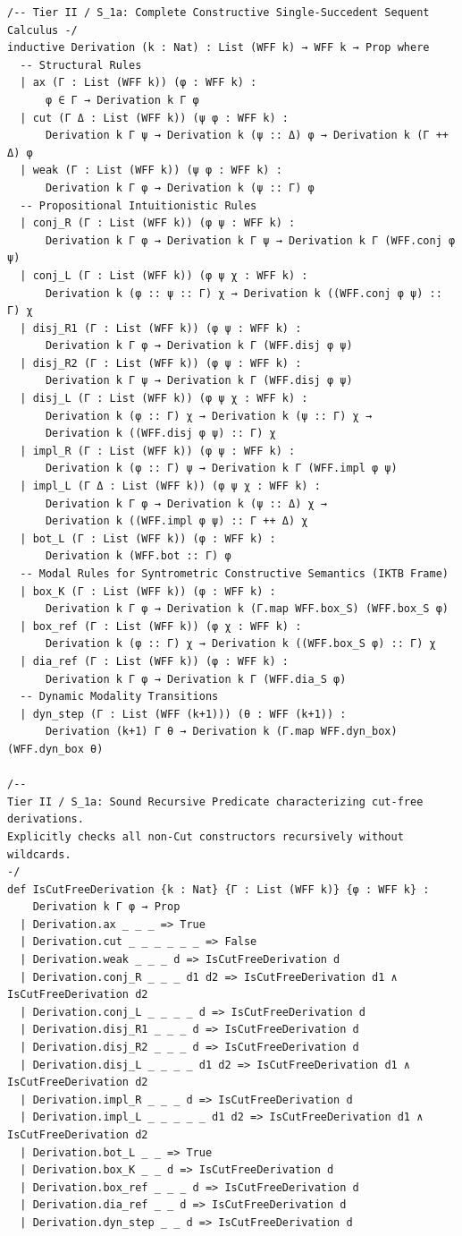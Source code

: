 \documentclass[
    12pt,
    a4paper,
    headings=normal,
    twoside=true,
    BCOR=8mm,
]{scrbook}
\begin{document}
\begin{verbatim}
/-- Tier II / S_1a: Complete Constructive Single-Succedent Sequent Calculus -/
inductive Derivation (k : Nat) : List (WFF k) → WFF k → Prop where
  -- Structural Rules
  | ax (Γ : List (WFF k)) (φ : WFF k) :
      φ ∈ Γ → Derivation k Γ φ
  | cut (Γ Δ : List (WFF k)) (ψ φ : WFF k) :
      Derivation k Γ ψ → Derivation k (ψ :: Δ) φ → Derivation k (Γ ++ Δ) φ
  | weak (Γ : List (WFF k)) (ψ φ : WFF k) :
      Derivation k Γ φ → Derivation k (ψ :: Γ) φ
  -- Propositional Intuitionistic Rules
  | conj_R (Γ : List (WFF k)) (φ ψ : WFF k) :
      Derivation k Γ φ → Derivation k Γ ψ → Derivation k Γ (WFF.conj φ ψ)
  | conj_L (Γ : List (WFF k)) (φ ψ χ : WFF k) :
      Derivation k (φ :: ψ :: Γ) χ → Derivation k ((WFF.conj φ ψ) :: Γ) χ
  | disj_R1 (Γ : List (WFF k)) (φ ψ : WFF k) :
      Derivation k Γ φ → Derivation k Γ (WFF.disj φ ψ)
  | disj_R2 (Γ : List (WFF k)) (φ ψ : WFF k) :
      Derivation k Γ ψ → Derivation k Γ (WFF.disj φ ψ)
  | disj_L (Γ : List (WFF k)) (φ ψ χ : WFF k) :
      Derivation k (φ :: Γ) χ → Derivation k (ψ :: Γ) χ →
      Derivation k ((WFF.disj φ ψ) :: Γ) χ
  | impl_R (Γ : List (WFF k)) (φ ψ : WFF k) :
      Derivation k (φ :: Γ) ψ → Derivation k Γ (WFF.impl φ ψ)
  | impl_L (Γ Δ : List (WFF k)) (φ ψ χ : WFF k) :
      Derivation k Γ φ → Derivation k (ψ :: Δ) χ →
      Derivation k ((WFF.impl φ ψ) :: Γ ++ Δ) χ
  | bot_L (Γ : List (WFF k)) (φ : WFF k) :
      Derivation k (WFF.bot :: Γ) φ
  -- Modal Rules for Syntrometric Constructive Semantics (IKTB Frame)
  | box_K (Γ : List (WFF k)) (φ : WFF k) :
      Derivation k Γ φ → Derivation k (Γ.map WFF.box_S) (WFF.box_S φ)
  | box_ref (Γ : List (WFF k)) (φ χ : WFF k) :
      Derivation k (φ :: Γ) χ → Derivation k ((WFF.box_S φ) :: Γ) χ
  | dia_ref (Γ : List (WFF k)) (φ : WFF k) :
      Derivation k Γ φ → Derivation k Γ (WFF.dia_S φ)
  -- Dynamic Modality Transitions
  | dyn_step (Γ : List (WFF (k+1))) (θ : WFF (k+1)) :
      Derivation (k+1) Γ θ → Derivation k (Γ.map WFF.dyn_box) (WFF.dyn_box θ)

/--
Tier II / S_1a: Sound Recursive Predicate characterizing cut-free derivations.
Explicitly checks all non-Cut constructors recursively without wildcards.
-/
def IsCutFreeDerivation {k : Nat} {Γ : List (WFF k)} {φ : WFF k} :
    Derivation k Γ φ → Prop
  | Derivation.ax _ _ _ => True
  | Derivation.cut _ _ _ _ _ _ => False
  | Derivation.weak _ _ _ d => IsCutFreeDerivation d
  | Derivation.conj_R _ _ _ d1 d2 => IsCutFreeDerivation d1 ∧ IsCutFreeDerivation d2
  | Derivation.conj_L _ _ _ _ d => IsCutFreeDerivation d
  | Derivation.disj_R1 _ _ _ d => IsCutFreeDerivation d
  | Derivation.disj_R2 _ _ _ d => IsCutFreeDerivation d
  | Derivation.disj_L _ _ _ _ d1 d2 => IsCutFreeDerivation d1 ∧ IsCutFreeDerivation d2
  | Derivation.impl_R _ _ _ d => IsCutFreeDerivation d
  | Derivation.impl_L _ _ _ _ _ d1 d2 => IsCutFreeDerivation d1 ∧ IsCutFreeDerivation d2
  | Derivation.bot_L _ _ => True
  | Derivation.box_K _ _ d => IsCutFreeDerivation d
  | Derivation.box_ref _ _ _ d => IsCutFreeDerivation d
  | Derivation.dia_ref _ _ d => IsCutFreeDerivation d
  | Derivation.dyn_step _ _ d => IsCutFreeDerivation d


\end{verbatim}
\end{document}
